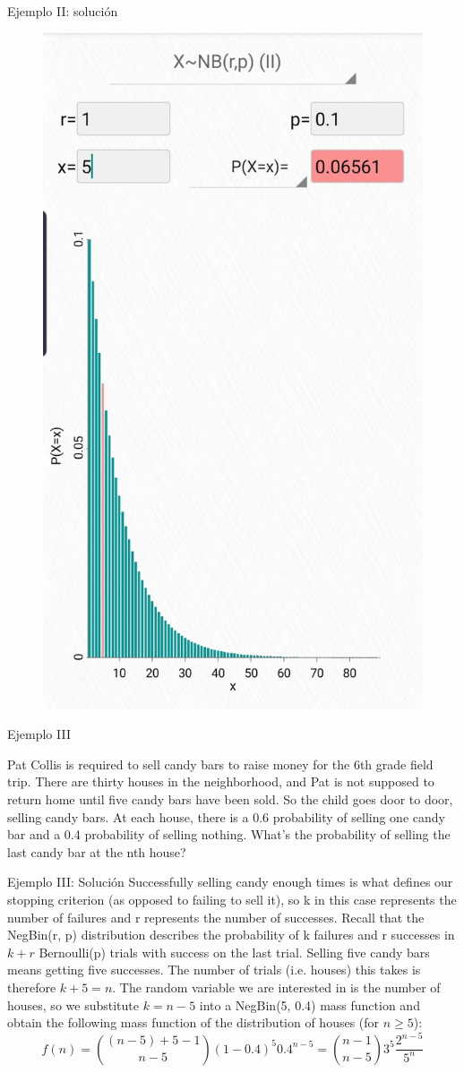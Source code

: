 \documentclass{beamer}
\begin{document}
	\begin{frame}{Ejemplo II: solución}
	    \begin{figure}
    		\includegraphics[width=0.4\linewidth]{II.jpg}
		\end{figure}
	\end{frame}
	\begin{frame}{Ejemplo III}
	    \begin{examples}
            Pat Collis is required to sell candy bars to raise money for the 6th grade field trip. There are thirty houses in the neighborhood, and Pat is not supposed to return home until five candy bars have been sold. So the child goes door to door, selling candy bars. At each house, there is a 0.6 probability of selling one candy bar and a 0.4 probability of selling nothing. What's the probability of selling the last candy bar at the nth house?
        \end{examples}
	\end{frame}
	\begin{frame}{Ejemplo III: Solución}
            Successfully selling candy enough times is what defines our stopping criterion (as opposed to failing to sell it), so k in this case represents the number of failures and r represents the number of successes. Recall that the NegBin(r, p) distribution describes the probability of k failures and r successes in $k + r$ Bernoulli(p) trials with success on the last trial. Selling five candy bars means getting five successes. The number of trials (i.e. houses) this takes is therefore $k + 5 = n$. The random variable we are interested in is the number of houses, so we substitute $k = n - 5$ into a NegBin(5, 0.4) mass function and obtain the following mass function of the distribution of houses (for $n \geq 5$):
            $$f(n) = \binom{(n-5) + 5 -1}{n-5}(1-0.4)^5 0.4^{n-5}=\binom{n-1}{n-5}3^5\frac{2^{n-5}}{5^n}$$
	\end{frame}
\end{document}
